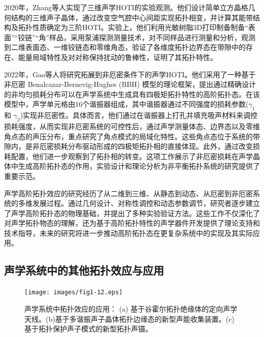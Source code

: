 2020年，Zhang等人实现了三维声学HOTI的实验观测\cite{i7}。他们设计简单立方晶格几何结构的三维声子晶体，通过改变空气腔中心间距实现拓扑相变，并计算其能带结构及拓扑性质确定为三阶HOTI。实验上，他们利用光敏树脂3D打印制备制备“表面”“铰链”“角”样品，采用泵浦探测测量技术，对不同样品进行测量和分析，观测到二维表面态、一维铰链态和零维角态，验证了各维度拓扑边界态在带隙中的存在、能量局域特性及对对称保持扰动的鲁棒性，证明了其拓扑特性。

2022年，Gao等人将研究拓展到非厄密条件下的声学HOTI\cite{i8}。他们采用了一种基于非厄密 Benalcazar-Bernevig-Hughes (BBH) 模型的理论框架，提出通过精确设计的非均匀损耗分布可以在声学系统中生成具有四极矩拓扑特性的高阶拓扑态。在该模型中，声学单元格由16个谐振器组成，其中谐振器通过不同强度的损耗参数(\(\gamma_1\) 和 \(\gamma_2\))实现非厄密性。具体而言，他们通过在谐振器上打孔并填充吸声材料来调控损耗强度，从而实现非厄密系统的可控性后，通过声学测量体态、边界态以及零维角点态的声压分布，重点研究了角点模式的局域化特性。这些角点态位于系统的带隙内，是非厄密损耗分布驱动形成的四极矩拓扑相的直接体现。此外，通过改变损耗配置，他们进一步观察到了拓扑相的转变。这项工作展示了非厄密损耗在声学晶体中生成高阶拓扑态的作用，实验设计和理论分析为非平衡拓扑系统的研究提供了重要示范。

声学高阶拓扑效应的研究经历了从二维到三维、从静态到动态、从厄密到非厄密系统的多维发展过程。通过几何设计、对称性调控和动态参数调节，研究者逐步建立了声学高阶拓扑态的物理基础，并提出了多种实验验证方法。这些工作不仅深化了对声学拓扑物态的理解，还为基于高阶拓扑特性的声学器件开发提供了理论支持和技术指导，未来的研究将进一步推动高阶拓扑态在更复杂系统中的实现及其实际应用。

\subsection{声学系统中的其他拓扑效应与应用}

\begin{figure}[h!]
    \centering
    \texttt{[image: images/fig1-12.eps]} 
    \caption{声学系统中拓扑效应的应用：
    (a) 基于谷霍尔拓扑绝缘体的定向声学天线\cite{j2}。(b)基于多谐振声子晶体拓扑边缘态的新型声能收集装置\cite{j17}。(c)基于拓扑保护声子模式的新型拓扑声镊\cite{j13}。
    }
    \label{fig_1_12}
\end{figure}

